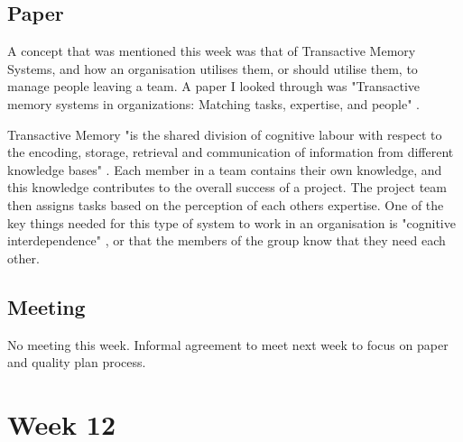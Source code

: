 \section{Paper}

A concept that was mentioned this week was that of Transactive Memory Systems, and how an organisation utilises them, or should utilise them, to manage people leaving a team. A paper I looked through was "Transactive memory systems in organizations: Matching tasks, expertise, and people" \parencite{week11}. 

Transactive Memory "is the shared division of cognitive labour with respect to the encoding, storage, retrieval and communication of information from different knowledge bases" \parencite{week11}. Each member in a team contains their own knowledge, and this knowledge contributes to the overall success of a project. The project team then assigns tasks based on the perception of each others expertise. One of the key things needed for this type of system to work in an organisation is "cognitive interdependence" \parencite{week11}, or that the members of the group know that they need each other.

\section{Meeting}

No meeting this week. Informal agreement to meet next week to focus on paper and quality plan process.

\chapter{Week 12}

